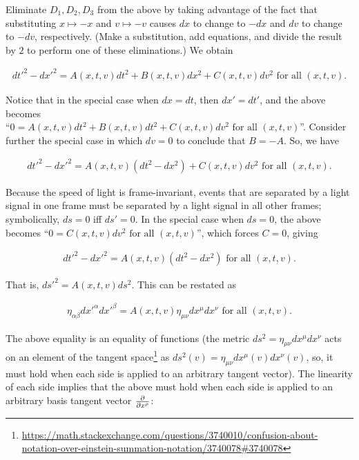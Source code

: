 \documentclass{article}
\begin{document}
Eliminate $D_1, D_2, D_3$ from the above by taking advantage of the fact that substituting $x \mapsto -x$ and $v \mapsto -v$ causes $dx$ to change to $-dx$ and $dv$ to change to $-dv$, respectively. (Make a substitution, add equations, and divide the result by $2$ to perform one of these eliminations.) We obtain

\begin{align*}
    dt'^2 - dx'^2 = A(x, t, v) dt^2 + B(x, t, v) dx^2 + C(x, t, v) dv^2 \text{ for all $(x, t, v)$}.
\end{align*}

Notice that in the special case when $dx = dt$, then $dx' = dt'$, and the above becomes \\ ``$0 = A(x, t, v) dt^2 + B(x, t, v) dt^2 + C(x, t, v) dv^2 \text{ for all $(x, t, v)$}$''. Consider further the special case in which $dv = 0$ to conclude that $B = - A$. So, we have

\begin{align*}
    dt'^2 - dx'^2 = A(x, t, v) (dt^2 - dx^2) + C(x, t, v) dv^2 \text{ for all $(x, t, v)$}.
\end{align*}

Because the speed of light is frame-invariant, events that are separated by a light signal in one frame must be separated by a light signal in all other frames; symbolically, $ds = 0$ iff $ds' = 0$. In the special case when $ds = 0$, the above becomes ``$0 = C(x, t, v) dv^2 \text{ for all $(x, t, v)$}$'', which forces $C = 0$, giving

\begin{align*}
    dt'^2 - dx'^2 = A(x, t, v)(dt^2 - dx^2) \text{ for all $(x, t, v)$}.
\end{align*}

That is, $ds'^2 = A(x, t, v) ds^2$. This can be restated as

\begin{align*}
    \eta_{\alpha \beta} dx'^\alpha dx'^\beta = A(x, t, v) \eta_{\mu \nu} dx^\mu dx^\nu \text{ for all $(x, t, v)$}.
\end{align*}

The above equality is an equality of functions (the metric $ds^2 = \eta_{\mu \nu} dx^\mu dx^\nu$ acts on an element of the tangent space\footnote{\url{https://math.stackexchange.com/questions/3740010/confusion-about-notation-over-einstein-summation-notation/3740078#3740078}} as $ds^2(v) = \eta_{\mu \nu} dx^\mu(v) dx^\nu(v)$, so, it must hold when each side is applied to an arbitrary tangent vector). The linearity of each side implies that the above must hold when each side is applied to an arbitrary basis tangent vector $\frac{\partial}{\partial x^\rho}$:
\end{document}
